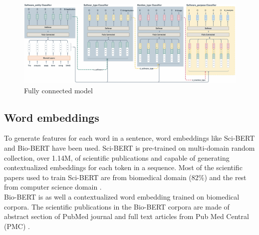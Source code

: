\begin{figure}[htbp]
	\centering
	\includegraphics[width=1\textwidth]{4.graphics/figures/models/pdf/fully_connected_model}
	\caption{Fully connected model }
	\label{fig:chapter05:setup}
\end{figure}

\subsection{Word embeddings}
\label{sec:chapter05:DLModels:wemb}

To generate features for each word in a sentence, word embeddings like Sci-BERT and Bio-BERT have been used. Sci-BERT is pre-trained on multi-domain random collection, over 1.14M, of scientific publications and capable of generating contextualized embeddings for each token in a sequence. Most of the scientific papers used to train Sci-BERT are from biomedical domain (82\%) and the rest from computer science domain \citep{beltagy2019scibert}. \\

Bio-BERT is as well a contextualized word embedding trained on biomedical corpora. The scientific publications in the Bio-BERT corpora are made of abstract section of PubMed journal and full text articles from Pub Med Central (PMC) \citep{li2019fine}. 


